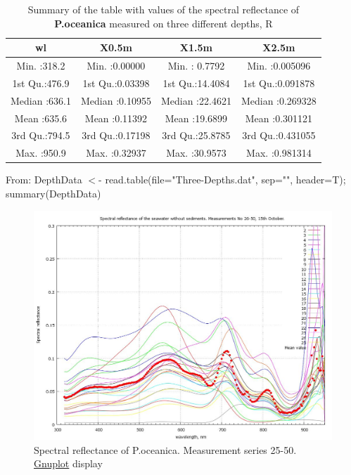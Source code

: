 \documentclass[10pt, a4paper]{article}
\begin{document}
\begin{appendices}
\begin{table}[H]
\end{table}

\pagebreak

\begin{table}[htbp]
	\caption{Summary of the table with values of the spectral reflectance of \textbf{P.oceanica} measured on three different depths, R}
	\begin{center}
	\begin{tabular}{|c|c|c|c|}
		\hline\hline
		wl & X0.5m & X1.5m & X2.5m\\ \hline\hline
		Min.   :318.2   &  Min.   :0.00000     &   Min.   : 0.7792     &   Min.   :0.005096  \\ \hline
		 1st Qu.:476.9   &  1st Qu.:0.03398    &  1st Qu.:14.4084    &  1st Qu.:0.091878  \\ \hline
		 Median :636.1   &   Median :0.10955    &  Median :22.4621   &  Median :0.269328 \\ \hline 
		 Mean   :635.6   &   Mean   :0.11392   &   Mean   :19.6899   &  Mean   :0.301121  \\ \hline
		 3rd Qu.:794.5   &   3rd Qu.:0.17198   &   3rd Qu.:25.8785    &  3rd Qu.:0.431055 \\ \hline  
		 Max.   :950.9     &  Max.   :0.32937    &  Max.   :30.9573   &   Max.   :0.981314  \\ \hline
	\end{tabular}
	\end{center}
		From: DepthData $<$- read.table(file="Three-Depths.dat", sep="", header=T); summary(DepthData)
	\label{tab:17}
\end{table}

\begin{figure}[H]
	\begin{center}
		\includegraphics[scale=0.25]{GNU-11.jpg}
		\caption{Spectral reflectance of P.oceanica. Measurement series 25-50. \\ \href{http://www.gnuplot.info/}{Gnuplot} display­}
		\label{fig:56}
	\end{center}
\end{figure}
\pagebreak


\end{appendices}
\end{document}
